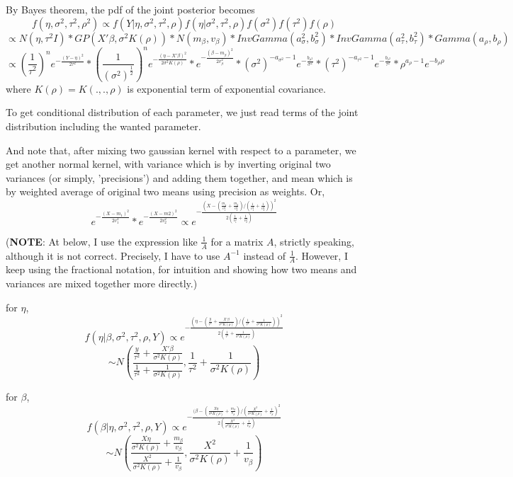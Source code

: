 \documentclass{article}
\begin{document}
By Bayes theorem, the pdf of the joint posterior becomes
\[f(\eta,\sigma^2,\tau^2,\rho^2)
    \propto f(Y|\eta,\sigma^2,\tau^2,\rho)f(\eta|\sigma^2,\tau^2,\rho)f(\sigma^2)f(\tau^2)f(\rho)\]
\[\propto N(\eta,\tau^2I) * GP(X'\beta, \sigma^2 K(\rho))
    * N(m_\beta,v_\beta) * InvGamma(a_\sigma^2, b_\sigma^2) * InvGamma(a_\tau^2, b_\tau^2)
    * Gamma(a_\rho, b_\rho) \]
\[\propto (\frac{1}{\tau^2})^n e^{-\frac{(Y-\eta)^2}{2\tau^2}}
    * (\frac{1}{(\sigma^2)^{\frac{1}{2}}})^n e^{-\frac{(\eta-X'\beta)^2}{2\sigma^2 K(\rho)}}
    * e^{-\frac{(\beta-m_\beta)^2}{2v_\beta^2}}
    * (\sigma^2)^{-a_{\sigma^2}-1} e^{-\frac{b_{\sigma^2}}{\sigma^2}}
    * (\tau^2)^{-a_{\tau^2}-1} e^{-\frac{b_{\tau^2}}{\tau^2}}
    * \rho^{a_{\rho}-1} e^{-b_{\rho}\rho}
    \]
where $K(\rho)=K(.,.,\rho)$ is exponential term of exponential covariance.

To get conditional distribution of each parameter, we just read terms of the joint distribution
including the wanted parameter. 

And note that, after mixing two gaussian kernel with respect to a parameter,
we get another normal kernel, with variance which is by inverting original two variances (or simply, 'precisions') and adding them together,
and mean which is by weighted average of original two means using precision as weights. Or,
\[e^{-\frac{(X-m_1)^2}{2v_1^2}} * e^{-\frac{(X-m2)^2}{2v_2^2}}
    \propto e^{-\frac{(X-(\frac{m_1}{v_1^2} + \frac{m_2}{v_2^2})/(\frac{1}{v_1^2} + \frac{1}{v_2^2}))^2}{2(\frac{1}{v_1^2}+\frac{1}{v_2^2})}}\]

\clearpage
(\textbf{NOTE}: At below, I use the expression like $\frac{1}{A}$ for a matrix $A$,
strictly speaking, although it is not correct. Precisely, I have to use $A^{-1}$ instead of $\frac{1}{A}$.
However, I keep using the fractional notation, for intuition and showing how two means and variances are mixed together more directly.)

for $\eta$,
\[f(\eta|\beta,\sigma^2,\tau^2,\rho,Y) \propto e^{-\frac{(\eta - (\frac{y}{\tau^2} + \frac{X'\beta}{\sigma^2 K(\rho)}) / (\frac{1}{\tau^2}+\frac{1}{\sigma^2 K(\rho)}))^2}{2(\frac{1}{\tau^2}+\frac{1}{\sigma^2 K(\rho)})}}
\]
\[\sim N(\frac{\frac{y}{\tau^2} + \frac{X'\beta}{\sigma^2 K(\rho)}}{\frac{1}{\tau^2}+\frac{1}{\sigma^2 K(\rho)}}, \frac{1}{\tau^2}+\frac{1}{\sigma^2 K(\rho)})\]

for $\beta$,
\[f(\beta|\eta,\sigma^2,\tau^2,\rho,Y) \propto e^{-\frac{(\beta - (\frac{X\eta}{\sigma^2 K(\rho)} + \frac{m_\beta}{v_\beta}) / (\frac{X^2}{\sigma^2 K(\rho)}+\frac{1}{v_\beta})^2}{2(\frac{X^2}{\sigma^2 K(\rho)}+\frac{1}{v_\beta})}}
\]
\[\sim N(\frac{\frac{X\eta}{\sigma^2 K(\rho)} + \frac{m_\beta}{v_\beta}}{\frac{X^2}{\sigma^2 K(\rho)}+\frac{1}{v_\beta}}, \frac{X^2}{\sigma^2 K(\rho)}+\frac{1}{v_\beta})\]
\end{document}
